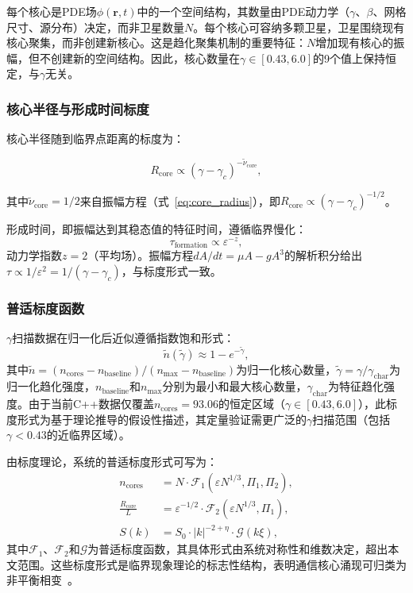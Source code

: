 \documentclass[sn-nature,pdflatex]{sn-jnl}
\begin{document}
每个核心是PDE场$\phi(\mathbf{r},t)$中的一个空间结构，其数量由PDE动力学（$\gamma$、$\beta$、网格尺寸、源分布）决定，而非卫星数量$N$。每个核心可容纳多颗卫星，卫星围绕现有核心聚集，而非创建新核心。这是趋化聚集机制的重要特征：$N$增加现有核心的振幅，但不创建新的空间结构。因此，核心数量在$\gamma \in [0.43, 6.0]$的9个值上保持恒定，与$\gamma$无关。

\subsubsection{核心半径与形成时间标度}

核心半径随到临界点距离的标度为：

\begin{equation}
R_{\text{core}} \propto (\gamma - \gamma_c)^{-\tilde{\nu}_{\text{core}}},
\end{equation}

其中$\tilde{\nu}_{\text{core}} = 1/2$来自振幅方程（式~\ref{eq:core_radius}），即$R_{\text{core}} \propto (\gamma-\gamma_c)^{-1/2}$。

形成时间，即振幅达到其稳态值的特征时间，遵循临界慢化：
\begin{equation}
\tau_{\text{formation}} \propto \varepsilon^{-z},
\end{equation}
动力学指数$z = 2$（平均场）。振幅方程$dA/dt = \mu A - g A^3$的解析积分给出$\tau \propto 1/\varepsilon^2 = 1/(\gamma - \gamma_c)$，与标度形式一致。

\subsubsection{普适标度函数}

$\gamma$扫描数据在归一化后近似遵循指数饱和形式：
\begin{equation}
\label{eq:scaling}
\tilde{n}(\tilde{\gamma}) \approx 1 - e^{-\tilde{\gamma}},
\end{equation}
其中$\tilde{n} = (n_{\text{cores}} - n_{\text{baseline}})/(n_{\text{max}} - n_{\text{baseline}})$为归一化核心数量，$\tilde{\gamma} = \gamma / \gamma_{\text{char}}$为归一化趋化强度，$n_{\text{baseline}}$和$n_{\text{max}}$分别为最小和最大核心数量，$\gamma_{\text{char}}$为特征趋化强度。由于当前C++数据仅覆盖$n_{\text{cores}} = 93.06$的恒定区域（$\gamma \in [0.43, 6.0]$），此标度形式为基于理论推导的假设性描述，其定量验证需更广泛的$\gamma$扫描范围（包括$\gamma < 0.43$的近临界区域）。

由标度理论，系统的普适标度形式可写为：
\begin{align}
n_{\text{cores}} &= N \cdot \mathcal{F}_1(\varepsilon N^{1/3}, \Pi_1, \Pi_2), \\
\frac{R_{\text{core}}}{L} &= \varepsilon^{-1/2} \cdot \mathcal{F}_2(\varepsilon N^{1/3}, \Pi_1), \\
S(k) &= S_0 \cdot |k|^{-2+\eta} \cdot \mathcal{G}(k \xi),
\end{align}
其中$\mathcal{F}_1$、$\mathcal{F}_2$和$\mathcal{G}$为普适标度函数，其具体形式由系统对称性和维数决定，超出本文范围。这些标度形式是临界现象理论的标志性结构，表明通信核心涌现可归类为非平衡相变~\cite{chaikin_lubensky_1995}。
\end{document}
